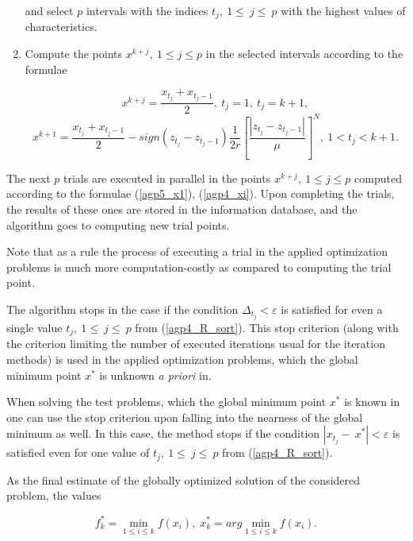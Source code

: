 \documentclass{svproc}
\begin{document}
\begin{enumerate}
	
	and select $p$ intervals with the indices $t_j,\ 1\le\ j\le\ p$ with the highest values of characteristics.
	
	\item Compute the points $x^{k+j},\ 1\leq j\leq p$ in the selected intervals according to the formulae
	
	 
\begin{equation}
	\label{agp5_x1}
	x^{k+j}=\frac{x_{t_j}+x_{t_j-1}}{2},\ t_j=1,\ t_j=k+1,
\end{equation}	
\begin{equation}
	\label{agp4_xi}	
	x^{k+1}=\frac{x_{t_j}+x_{t_j-1}}{2}-sign\left(z_{t_j}-z_{t_j-1}\right)\frac{1}{2r}\left[\frac{\left|z_{t_j}-z_{t_j-1}\right|}{\mu}\right]^N,\ 1<t_j<k+1.
\end{equation}
	
	
\end{enumerate}

The next $p$ trials are executed in parallel in the points $x^{k+j},\ 1\leq j\leq p$ computed according  to the formulae (\ref{agp5_x1}), (\ref{agp4_xi}). Upon completing the trials, the results of these ones  are stored in the information database, and the algorithm goes to computing new trial points.

Note that as a rule the process of executing a trial in the applied optimization problems is much more  computation-costly as compared to computing the trial point.

The algorithm stops in the case if the condition \(\Delta_{t_j} < \varepsilon\) is satisfied for even a  single value $t_j,\ 1\le\ j\le\ p$ from (\ref{agp4_R_sort}). This stop criterion (along with the criterion limiting the number of executed iterations usual for the  iteration methods) is used in the applied optimization problems, which the global minimum point  $x^*$ is unknown \textit{a priori} in. 

When solving the test problems, which the global minimum point $x^*$ is known in one can use the  stop criterion upon falling into the nearness of the global minimum as well. In this case, the method  stops if the condition $\left|x_{t_j}-\ x^\ast\right| < \varepsilon$ is satisfied even for one value of $t_j,\  1\le\ j\le\ p$ from (\ref{agp4_R_sort}). 

As the final estimate of the globally optimized solution of the considered problem, the values 


\begin{equation} 
	f_k^*=\min_{1\leq i \leq k}f(x_i), \; x_k^*=arg \min_{1\leq i \leq k}f(x_i). 
\end{equation} 
\end{document}
